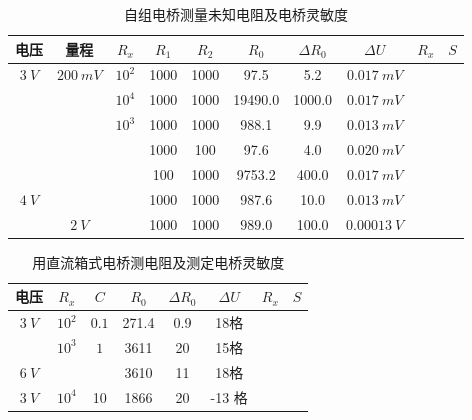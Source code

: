 \documentclass[UTF8]{ctexart}
\begin{document}
\begin{table}[H]
\centering
\caption{自组电桥测量未知电阻及电桥灵敏度}
\begin{tabular}{|c|c|c|c|c|c|c|c|c|c|}
\hline
 电压  &  量程   &   $R_x$  &  $R_1$   &  $R_2$   &  $R_0$   &   $\Delta R_0$  &  $\Delta U$  &  $R_x$  &   $S$ \\
\hline
 \multirow{5}{*}{$3 \ V$}  & \multirow{6}{*}{$200 \ mV$} & $10^2$ &  1000 &  1000 &  97.5  &   5.2  &  $0.017 \ mV$  &      &    \\ \cline{3-10} 

  &   &    $10^4$ &  1000  &  1000  &   19490.0   &1000.0  &   $0.017\ mV$  &    &  \\\cline{3-10} 

  &   &    \multirow{5}{*}{$10^3$}  &   1000 &  1000  &   988.1   &  9.9  &  $0.013 \ mV$  &   &   \\\cline{4-10} 

  &   &    &   1000  &  100  &  97.6  &   4.0   &  $0.020 \ mV$  &    &    \\\cline{4-10} 

  &   &    &   100   &  1000 &  9753.2  &  400.0  &  $0.017 \ mV$  &   &   \\\cline{4-10} \cline{1-1}

  \multirow{2}{*}{$4 \ V$} &     &   &   1000  &  1000 & 987.6   &  10.0  &  $0.013 \ mV$ &   & \\\cline{4-10} \cline{2-2}

  &     $2 \ V$  &    &   1000   &  1000  &$  989.0$  &100.0  &  $0.00013 \ V$  &   &\\
\hline
\end{tabular}
\end{table}

\begin{table}[H]
\centering
\caption{用直流箱式电桥测电阻及测定电桥灵敏度}
\begin{tabular}{|c|c|c|c|c|c|c|c|}
\hline
 电压     &   $R_x$  &  $C$   &  $R_0$   &  $ \Delta R_0$   &   $\Delta U$  &  $R_x$  &   $S$ \\
\hline
 \multirow{2}{*}{$3 \ V$}  &  $10^2$ &  $0.1$ &  271.4 &  0.9    &  18格 &  &    \\ \cline{2-8} 

 &  \multirow{2}{*}{$10^3$} &  \multirow{2}{*}{$1$} &   3611  &  20  &  15格 &  &  \\ \cline{1-1}  \cline{4-8}

 $6 \ V$ &    &   &   3610  &  11  &  18格  &   &  \\ \cline{1-8}

$3 \ V$  &  $10^4$  & 10  &  1866   &  20   &  -13 格  &   &   \\ \cline{1-8}
\hline
\end{tabular}
\end{table}
\end{document}
